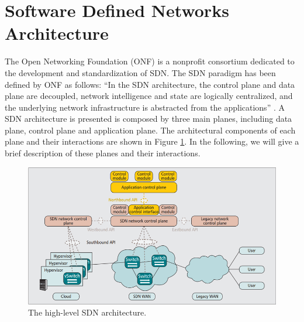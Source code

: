 \section{Software Defined Networks Architecture} \label{sec:SDN_BGK}
The Open Networking Foundation (ONF) \cite{ONF} is a nonprofit consortium dedicated to the development and standardization of SDN. The SDN paradigm has been defined by ONF as follows: “In the SDN architecture, the control plane and data plane are decoupled, network intelligence and state are logically centralized, and the underlying network infrastructure is abstracted from the applications” \cite{Sezer2013}.
A SDN architecture is presented is composed by three main planes, including data plane, control plane and application plane. The architectural components of each plane and their interactions are shown in Figure \ref{fig:{ONF}}. In the following, we will give a brief description of these planes and their interactions.
\begin{figure}[tb!]
	\centering
	\includegraphics[width=13cm]{figure/ONF.png}
	\caption{The high-level SDN architecture.}
	\label{fig:{ONF}}
\end{figure}
